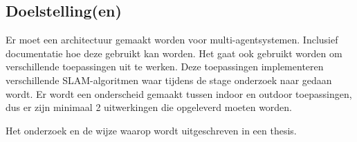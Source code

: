 \newpage

\subsection{Doelstelling(en)}
  Er moet een architectuur gemaakt worden voor multi-agentsystemen. Inclusief documentatie hoe deze gebruikt kan worden. Het gaat ook gebruikt worden om verschillende toepassingen uit te werken. Deze toepassingen implementeren verschillende SLAM-algoritmen waar tijdens de stage onderzoek naar gedaan wordt. Er wordt een onderscheid gemaakt tussen indoor en outdoor toepassingen, dus er zijn minimaal 2 uitwerkingen die opgeleverd moeten worden.\par
  Het onderzoek en de wijze waarop wordt uitgeschreven in een thesis.

\newpage

